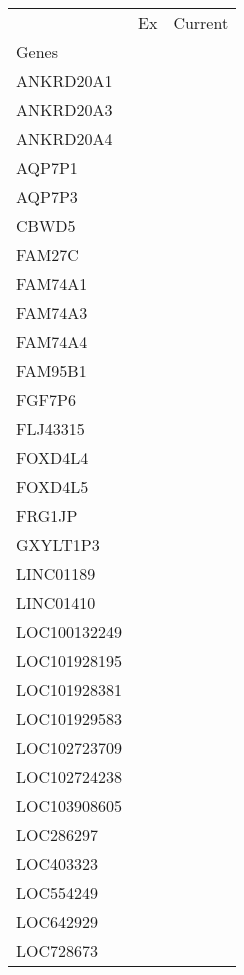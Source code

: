 \begin{tabular}{lcc}
\toprule
{} & Ex & Current \\
Genes              &    &         \\
\midrule
ANKRD20A1          &    &         \\
ANKRD20A3          &    &         \\
ANKRD20A4          &    &         \\
AQP7P1             &    &         \\
AQP7P3             &    &         \\
CBWD5              &    &         \\
FAM27C             &    &         \\
FAM74A1            &    &         \\
FAM74A3            &    &         \\
FAM74A4            &    &         \\
FAM95B1            &    &         \\
FGF7P6             &    &         \\
FLJ43315           &    &         \\
FOXD4L4            &    &         \\
FOXD4L5            &    &         \\
FRG1JP             &    &         \\
GXYLT1P3           &    &         \\
LINC01189          &    &         \\
LINC01410          &    &         \\
LOC100132249       &    &         \\
LOC101928195       &    &         \\
LOC101928381       &    &         \\
LOC101929583       &    &         \\
LOC102723709       &    &         \\
LOC102724238       &    &         \\
LOC103908605       &    &         \\
LOC286297          &    &         \\
LOC403323          &    &         \\
LOC554249          &    &         \\
LOC642929          &    &         \\
LOC728673          &    &         \\

\end{tabular}
